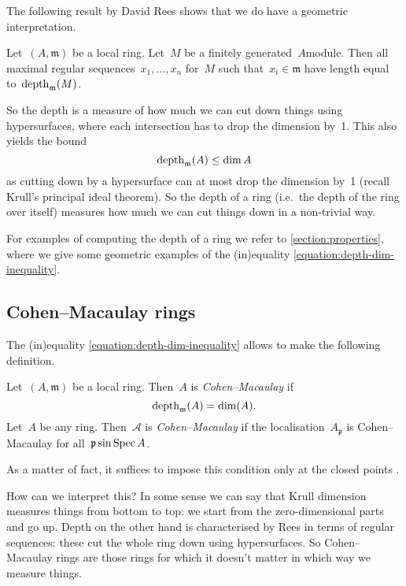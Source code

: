 \documentclass[10pt,a4paper]{article}
\begin{document}
The following result by David Rees shows that we do have a geometric interpretation.
\begin{theorem}
  Let~$(A,\mathfrak{m})$ be a local ring. Let~$M$ be a finitely generated~$A$\dash module. Then all maximal regular sequences~$x_1,\dotsc,x_n$ for~$M$ such that~$x_i\in\mathfrak{m}$ have length equal to~$\operatorname{depth}_{\mathfrak{m}}(M)$.
\end{theorem}
So the depth is a measure of how much we can cut down things using hypersurfaces, where each intersection has to drop the dimension by~1. This also yields the bound
\begin{equation}
  \label{equation:depth-dim-inequality}
  \operatorname{depth}_{\mathfrak{m}}(A)\leq\dim A
\end{equation}
as cutting down by a hypersurface can at most drop the dimension by~1 (recall Krull's principal ideal theorem). So the depth of a ring (i.e.\ the depth of the ring over itself) measures how much we can cut things down in a non-trivial way.

For examples of computing the depth of a ring we refer to \cref{section:properties}, where we give some geometric examples of the (in)equality \eqref{equation:depth-dim-inequality}.


\subsection{Cohen--Macaulay rings}
The (in)equality \eqref{equation:depth-dim-inequality} allows to make the following definition.
\begin{definition}
  Let~$(A,\mathfrak{m})$ be a local ring. Then~$A$ is \emph{Cohen--Macaulay} if
  \begin{equation}
    \operatorname{depth}_{\mathfrak{m}}(A)=\dim(A).
  \end{equation}
  Let~$A$ be any ring. Then~$\mathcal{A}$ is \emph{Cohen--Macaulay} if the localisation~$A_{\mathfrak{p}}$ is Cohen--Macaulay for all~$\mathfrak{p}\sin\operatorname{Spec} A$.
\end{definition}
As a matter of fact, it suffices to impose this condition only at the closed points \cite[proposition 18.8]{eisenbud-commutative-algebra}.

How can we interpret this? In some sense we can say that Krull dimension measures things from bottom to top: we start from the zero-dimensional parts and go up. Depth on the other hand is characterised by Rees in terms of regular sequences: these cut the whole ring down using hypersurfaces. So Cohen--Macaulay rings are those rings for which it doesn't matter in which way we measure things.
\end{document}
